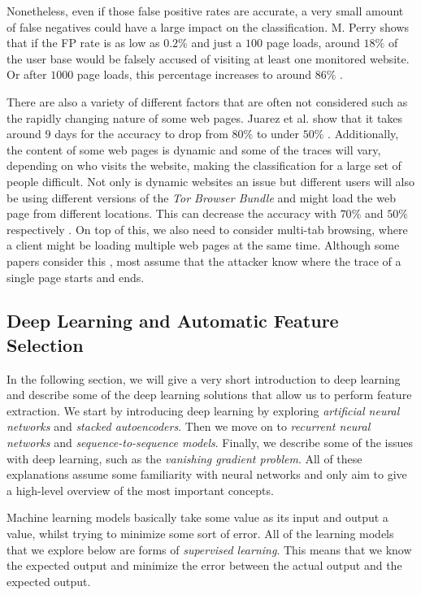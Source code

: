 Nonetheless, even if those false positive rates are accurate, a very small amount of false negatives could have a large impact on the classification.
M. Perry shows that if the FP rate is as low as $0.2\%$ and just a $100$ page loads, around $18\%$ of the user base would be falsely accused of visiting at least one monitored website.
Or after $1000$ page loads, this percentage increases to around $86\%$ \cite{wfpcritique}.

There are also a variety of different factors that are often not considered such as the rapidly changing nature of some web pages.
Juarez et al. show that it takes around $9$ days for the accuracy to drop from $80\%$ to under $50\%$ \cite{wfpevaluation}.
Additionally, the content of some web pages is dynamic and some of the traces will vary, depending on who visits the website, making the classification for a large set of people difficult.
Not only is dynamic websites an issue but different users will also be using different versions of the \textit{Tor Browser Bundle} and might load the web page from different locations.
This can decrease the accuracy with $70\%$ and $50\%$ respectively \cite{wfpevaluation}.
On top of this, we also need to consider multi-tab browsing, where a client might be loading multiple web pages at the same time.
Although some papers consider this \cite{naivebayes}, most assume that the attacker know where the trace of a single page starts and ends.

\subsection{Deep Learning and Automatic Feature Selection}

In the following section, we will give a very short introduction to deep learning and describe some of the deep learning solutions that allow us to perform feature extraction.
We start by introducing deep learning by exploring \textit{artificial neural networks} and \textit{stacked autoencoders}.
Then we move on to \textit{recurrent neural networks} and \textit{sequence-to-sequence models}.
Finally, we describe some of the issues with deep learning, such as the \textit{vanishing gradient problem}.
All of these explanations assume some familiarity with neural networks and only aim to give a high-level overview of the most important concepts.

Machine learning models basically take some value as its input and output a value, whilst trying to minimize some sort of error.
All of the learning models that we explore below are forms of \textit{supervised learning}.
This means that we know the expected output and minimize the error between the actual output and the expected output.

